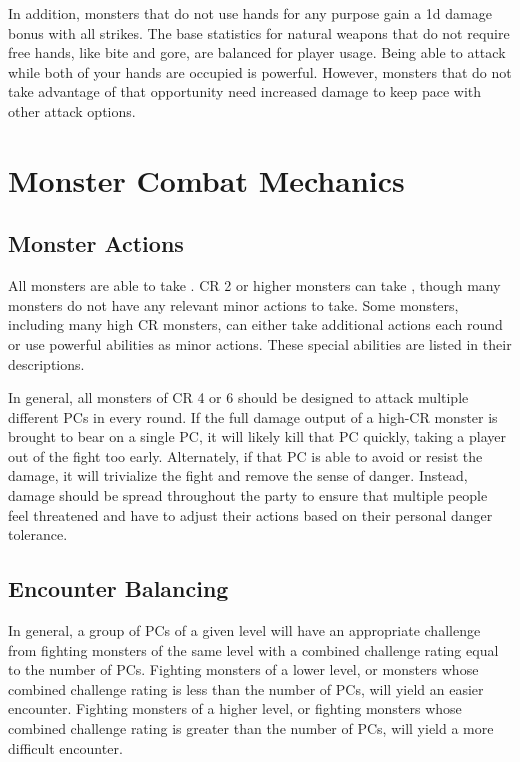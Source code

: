         In addition, monsters that do not use hands for any purpose gain a \plus1d damage bonus with all strikes.
        The base statistics for natural weapons that do not require free hands, like bite and gore, are balanced for player usage.
        Being able to attack while both of your hands are occupied is powerful.
        However, monsters that do not take advantage of that opportunity need increased damage to keep pace with other attack options.

\section{Monster Combat Mechanics}

    \subsection{Monster Actions}
        All monsters are able to take .
        CR 2 or higher monsters can take , though many monsters do not have any relevant minor actions to take.
        Some monsters, including many high CR monsters, can either take additional actions each round or use powerful abilities as minor actions.
        These special abilities are listed in their descriptions.

        In general, all monsters of CR 4 or 6 should be designed to attack multiple different PCs in every round.
        If the full damage output of a high-CR monster is brought to bear on a single PC, it will likely kill that PC quickly, taking a player out of the fight too early.
        Alternately, if that PC is able to avoid or resist the damage, it will trivialize the fight and remove the sense of danger.
        Instead, damage should be spread throughout the party to ensure that multiple people feel threatened and have to adjust their actions based on their personal danger tolerance.

    \subsection{Encounter Balancing}\label{Encounter Balancing}
        In general, a group of PCs of a given level will have an appropriate challenge from fighting monsters of the same level with a combined challenge rating equal to the number of PCs.
        Fighting monsters of a lower level, or monsters whose combined challenge rating is less than the number of PCs, will yield an easier encounter.
        Fighting monsters of a higher level, or fighting monsters whose combined challenge rating is greater than the number of PCs, will yield a more difficult encounter.

